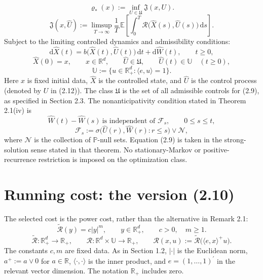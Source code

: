 \documentclass{article}
\begin{document}
\begin{equation}
\varrho_*(x):=\inf_{U\in\mathfrak U}\mathfrak J(x,U).
\tag{2.12}
\end{equation}
\[
\mathfrak J(x,\hat U):=\limsup_{T\to\infty}\frac1T\,\mathbb E\left[\int_0^T\mathcal R\bigl(\hat X(s),\hat U(s)\bigr)\,\mathrm ds\right].
\]
Subject to the limiting controlled dynamics and admissibility conditions:
\begin{equation}
\mathrm d\hat X(t)=b\bigl(\hat X(t),\hat U(t)\bigr)\,\mathrm dt+\mathrm d\hat W(t),\qquad t\geq0,
\tag{2.9}
\end{equation}
\[
\hat X(0)=x,\qquad x\in\mathbb R^d,
\qquad \hat U\in\mathfrak U,\qquad \hat U(t)\in\mathbb U\quad(t\geq0),
\]
\[
\mathbb U:=\{u\in\mathbb R_+^d:\langle e,u\rangle=1\}.
\]
Here \(x\) is fixed initial data, \(\hat X\) is the controlled state, and \(\hat U\) is the control process (denoted by \(U\) in (2.12)). The class \(\mathfrak U\) is the set of all admissible controls for (2.9), as specified in Section 2.3. The nonanticipativity condition stated in Theorem 2.1(iv) is
\[
\hat W(t)-\hat W(s)\ \text{is independent of }\mathcal F_s,
\qquad 0\leq s\leq t,
\]
\[
\mathcal F_s:=\sigma\bigl(\hat U(r),\hat W(r):r\leq s\bigr)\vee\mathcal N,
\]
where \(\mathcal N\) is the collection of \(\mathbb P\)-null sets. Equation (2.9) is taken in the strong-solution sense stated in that theorem. No stationary-Markov or positive-recurrence restriction is imposed on the optimization class.

\section*{Running cost: the version (2.10)}
The selected cost is the power cost, rather than the alternative in Remark 2.1:
\begin{equation}
\widetilde{\mathcal R}(y)=c|y|^m,\qquad y\in\mathbb R_+^d,
\qquad c>0,\quad m\geq1.
\tag{2.10}
\end{equation}
\[
\widetilde{\mathcal R}:\mathbb R_+^d\longrightarrow\mathbb R_+,
\qquad
\mathcal R:\mathbb R^d\times\mathbb U\longrightarrow\mathbb R_+,
\qquad
\mathcal R(x,u):=\widetilde{\mathcal R}\bigl(\langle e,x\rangle^+u\bigr).
\]
The constants \(c,m\) are fixed data. As in Section 1.2, \(|\cdot|\) is the Euclidean norm, \(a^+:=a\vee0\) for \(a\in\mathbb R\), \(\langle\cdot,\cdot\rangle\) is the inner product, and \(e=(1,\ldots,1)^\prime\) in the relevant vector dimension. The notation \(\mathbb R_+\) includes zero.
\end{document}
